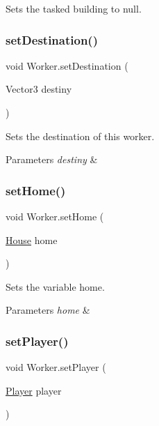 Sets the tasked building to null. 

\mbox{\label{class_worker_ae01182ca082cf86ec49d6392654a90a1}} 
\subsubsection{\texorpdfstring{set\+Destination()}{setDestination()}}
{\footnotesize\ttfamily void Worker.\+set\+Destination (\begin{DoxyParamCaption}\item[{Vector3}]{destiny }\end{DoxyParamCaption})}



Sets the destination of this worker. 


\begin{DoxyParams}{Parameters}
{\em destiny} & \\
\hline
\end{DoxyParams}
\mbox{\label{class_worker_a13feed5a2e9d542b506ac1d1454d2ebf}} 
\subsubsection{\texorpdfstring{set\+Home()}{setHome()}}
{\footnotesize\ttfamily void Worker.\+set\+Home (\begin{DoxyParamCaption}\item[{\mbox{\hyperlink{class_house}{House}}}]{home }\end{DoxyParamCaption})}



Sets the variable home. 


\begin{DoxyParams}{Parameters}
{\em home} & \\
\hline
\end{DoxyParams}
\mbox{\label{class_worker_a9bcae4b811749fe167231b32480e5fe1}} 
\subsubsection{\texorpdfstring{set\+Player()}{setPlayer()}}
{\footnotesize\ttfamily void Worker.\+set\+Player (\begin{DoxyParamCaption}\item[{\mbox{\hyperlink{class_player}{Player}}}]{player }\end{DoxyParamCaption})}



